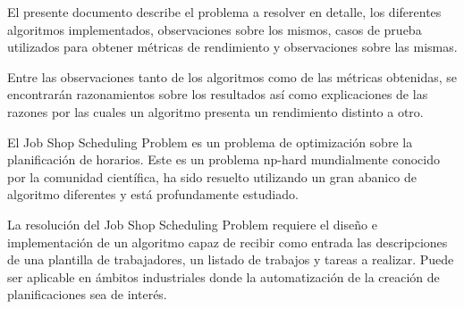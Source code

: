 El presente documento describe el problema a resolver en detalle,
los diferentes algoritmos implementados,
observaciones sobre los mismos,
casos de prueba utilizados para obtener métricas de rendimiento
y observaciones sobre las mismas.

Entre las observaciones tanto de los algoritmos como de las métricas
obtenidas, se encontrarán razonamientos sobre los resultados así
como explicaciones de las razones por las cuales un algoritmo
presenta un rendimiento distinto a otro.

El Job Shop Scheduling Problem es un problema de optimización
sobre la planificación de horarios.
Este es un problema np-hard mundialmente conocido
por la comunidad científica,
ha sido resuelto utilizando un gran abanico de algoritmo diferentes
y está profundamente estudiado.

La resolución del Job Shop Scheduling Problem requiere el diseño e implementación de
un algoritmo capaz de recibir como entrada las descripciones de una plantilla
de trabajadores, un listado de trabajos y tareas a realizar. Puede ser
aplicable en ámbitos industriales donde la automatización de la creación
de planificaciones sea de interés.
